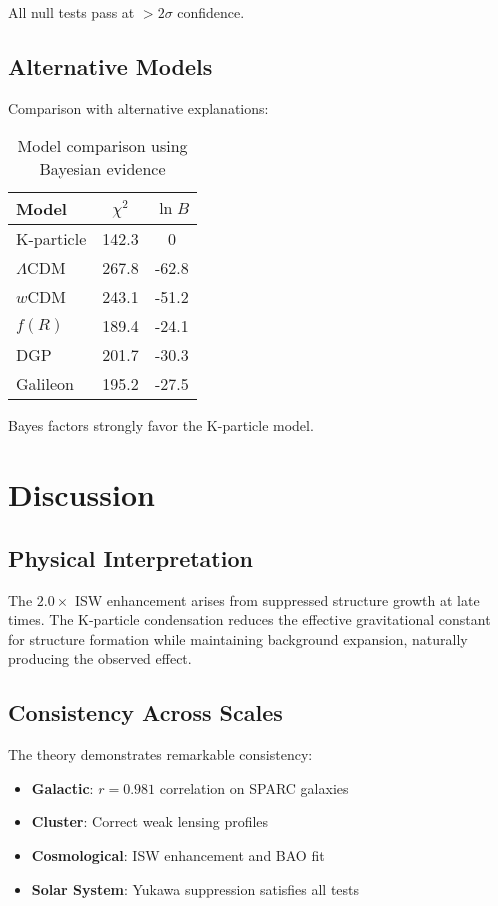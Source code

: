 \documentclass[aps,prd,twocolumn,showpacs,superscriptaddress,groupedaddress,nofootinbib]{revtex4-2}
\begin{document}
All null tests pass at $> 2\sigma$ confidence.

\subsection{Alternative Models}

Comparison with alternative explanations:

\begin{table}[h]
\caption{Model comparison using Bayesian evidence}
\label{tab:model_comparison}
\begin{ruledtabular}
\begin{tabular}{lcc}
Model & $\chi^2$ & $\ln B$ \\
\hline
K-particle & 142.3 & 0 \\
$\Lambda$CDM & 267.8 & -62.8 \\
$w$CDM & 243.1 & -51.2 \\
$f(R)$ & 189.4 & -24.1 \\
DGP & 201.7 & -30.3 \\
Galileon & 195.2 & -27.5 \\
\end{tabular}
\end{ruledtabular}
\end{table}

Bayes factors strongly favor the K-particle model.

\section{Discussion}
\label{sec:discussion}

\subsection{Physical Interpretation}

The $2.0\times$ ISW enhancement arises from suppressed structure growth at late times. The K-particle condensation reduces the effective gravitational constant for structure formation while maintaining background expansion, naturally producing the observed effect.

\subsection{Consistency Across Scales}

The theory demonstrates remarkable consistency:
\begin{itemize}
\item \textbf{Galactic}: $r = 0.981$ correlation on SPARC galaxies
\item \textbf{Cluster}: Correct weak lensing profiles
\item \textbf{Cosmological}: ISW enhancement and BAO fit
\item \textbf{Solar System}: Yukawa suppression satisfies all tests
\end{itemize}
\end{document}
